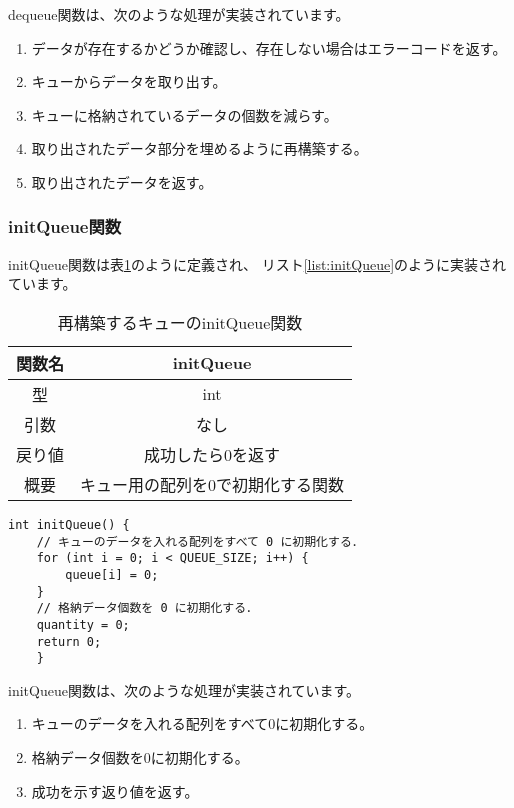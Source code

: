 \documentclass[a4j]{jarticle}
\begin{document}
dequeue関数は、次のような処理が実装されています。
\begin{enumerate}
  \item データが存在するかどうか確認し、存在しない場合はエラーコードを返す。
  \item キューからデータを取り出す。
  \item キューに格納されているデータの個数を減らす。
  \item 取り出されたデータ部分を埋めるように再構築する。
  \item 取り出されたデータを返す。
\end{enumerate}

\subsubsection{initQueue関数}
initQueue関数は表\ref{table:initQueue}のように定義され、
リスト\ref{list:initQueue}のように実装されています。

\newpage

\begin{table}[htbp]
  \centering
  \caption{再構築するキューのinitQueue関数}
  \label{table:initQueue}
  \begin{tabular}{|c|c|}
    \hline
    関数名 & initQueue         \\
    \hline
    型   & int               \\
    \hline
    引数  & なし                \\
    \hline
    戻り値 & 成功したら0を返す         \\
    \hline
    概要  & キュー用の配列を0で初期化する関数 \\
    \hline
  \end{tabular}
\end{table}

\begin{lstlisting}[caption=再構築するキューのinitQueue関数の実装,label=list:initQueue]
    int initQueue() {
    // キューのデータを入れる配列をすべて 0 に初期化する．
    for (int i = 0; i < QUEUE_SIZE; i++) {
        queue[i] = 0;
    }
    // 格納データ個数を 0 に初期化する．
    quantity = 0;
    return 0;
    }
\end{lstlisting}

initQueue関数は、次のような処理が実装されています。
\begin{enumerate}
  \item キューのデータを入れる配列をすべて0に初期化する。
  \item 格納データ個数を0に初期化する。
  \item 成功を示す返り値を返す。
\end{enumerate}
\end{document}
